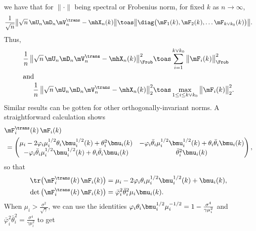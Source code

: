 we have that for $\| \cdot \|$ being spectral or Frobenius norm, for
fixed $k$ as $n\to \infty$,
\[
    \frac{1}{\sqrt{n}}
    \big\| \sqrt{n} \, \mU_n \mD_n \mV_n^\trans - \mhX_n(k) \big\|
        \toas
        \big\|
            \diag \big(
                \mF_1(k),
                \mF_2(k),
                \ldots
                \mF_{k \vee k_0}(k)
            \big) \big\|.
\]
Thus,
\begin{align}
    \frac{1}{n} \,
    \big\| \sqrt{n} \, \mU_n \mD_n \mV_n^\trans - \mhX_n(k) \big\|_\Frob^2
        &\toas
            \sum_{i=1}^{k \vee k_0}
                \big\| \mF_i(k) \big\|_\Frob^2 \\
\intertext{and} \label{E:spec2-loss-limit}
    \frac{1}{n} \,
    \big\| \sqrt{n} \, \mU_n \mD_n \mV_n^\trans - \mhX_n(k) \big\|_2^2
        &\toas
            \max_{1 \leq i \leq k \vee k_0}
                \big\| \mF_i(k) \big\|_2^2. 
\end{align}
Similar results can be gotten for other orthogonally-invariant norms.
A straightforward calculation shows
\[
    \begin{split}
    &\mF_i^\trans(k) \, \mF_i(k) \\
        &\,=
        \left(
        \begin{matrix}
            \mu_i 
            - 2 \varphi_i \mu_i^{1/2} \theta_i \bmu_i^{1/2}(k) 
            + \theta_i^2 \bmu_i(k) &
                - \varphi_i \bar \theta_i \mu_i^{1/2} \bmu_i^{1/2}(k)
                + \theta_i \bar \theta_i \bmu_i(k) \\
            - \varphi_i \bar \theta_i \mu_i^{1/2} \bmu_i^{1/2}(k)
            + \theta_i \bar \theta_i \bmu_i(k) &
                \bar \theta_i^2 \bmu_i(k)
        \end{matrix}
        \right),
    \end{split}
\]
so that
\begin{align*}
    \tr \big( \mF_i^\trans(k) \, \mF_i(k) \big)
        &= \mu_i 
           - 2 \varphi_i \theta_i \mu_i^{1/2} \bmu_i^{1/2} (k) 
           + \bmu_i(k), \\
    \det \big( \mF_i^\trans(k) \, \mF_i(k) \big)
        &= \bar \varphi_i^2 \bar \theta_i^2 \mu_i \bmu_i(k).
\end{align*}
When $\mu_i > \frac{\sigma^2}{\sqrt{\gamma}}$, we can use the identities
\(
    \varphi_i \theta_i \bmu_i^{1/2} \mu_i^{-1/2}
    =
    1
    -
    \frac{\sigma^4}{\gamma \mu_i^2}
\)
and
\(
    \bar \varphi_i^2 \bar \theta_i^2
    =
    \frac{\sigma^4}{\gamma \mu_i^2}
\)
to get
